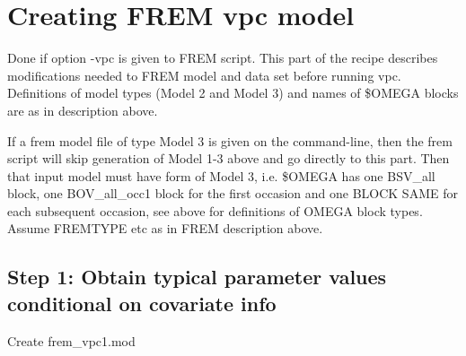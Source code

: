 \section{Creating FREM vpc model}
Done if option -vpc is given to FREM script. This part of the recipe describes modifications needed to FREM model and data set before running vpc. Definitions of model types (Model 2 and Model 3) and names of \$OMEGA blocks are as in description above. 

If a frem model file of type Model 3 is given on the command-line, then the frem script will skip generation of Model 1-3 above and go directly to this part. Then that input model must have form of Model 3, i.e. \$OMEGA has one BSV\_all block, one BOV\_all\_occ1 block for the first occasion and one BLOCK SAME for each subsequent occasion, see above for definitions of OMEGA block types.  Assume FREMTYPE etc as in FREM description above.

\subsection{Step 1: Obtain typical parameter values conditional on covariate info}
Create frem\_vpc1.mod

